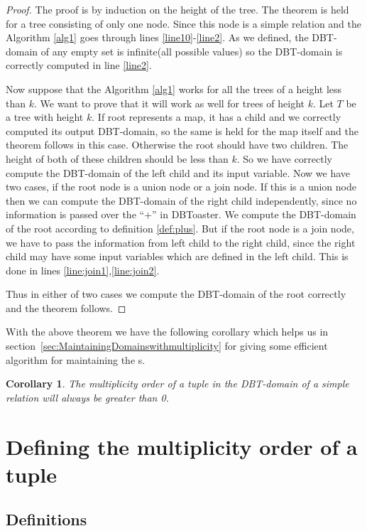 \documentclass[12pt]{article}
\newtheorem{corollary}{Corollary}[section]
\begin{document}
\begin{proof}
The proof is by induction on the height of the tree. The theorem is held for a tree consisting of only one node. Since this node is a simple relation and the Algorithm \ref{alg1} goes  through lines \ref{line10}-\ref{line2}. As we defined, the DBT-domain of any empty set is infinite(all possible values) so the DBT-domain is correctly computed in line \ref{line2}.

Now suppose that the Algorithm \ref{alg1} works for all the trees of a height less than $k$. We want to prove that it will work as well for trees of height $k$. Let $T$ be a tree with height $k$. If root represents a map, it has a child and we correctly computed its output DBT-domain, so the same is held for the map itself and the theorem follows in this case. Otherwise
the root should have two children. The height of both of these children should be less than $k$. So we have correctly compute the DBT-domain of the left child and its input variable. Now we have two cases, if the root node is a union node or a join node. If this is a union node then we can compute the DBT-domain of the right child independently, since no information is passed over the ``+'' in DBToaster\cite{1}. We compute the DBT-domain of the root according to definition \eqref{def:plus}. But if the root node is a join node, we have to pass the information from left child to the right child, since the right child may have some input variables which are defined in the left child. This is done in lines \ref{line:join1},\ref{line:join2}.\par
Thus in either of two cases we compute the DBT-domain of the root correctly and the theorem follows.
\end{proof}
With the above theorem we have the following corollary which helps us in section~\ref{sec:MaintainingDomainswithmultiplicity} for giving some efficient algorithm for maintaining the \dom{}s. 
\begin{corollary}
\label{col:arity0}
The multiplicity order of a tuple in the DBT-domain of a simple relation will always be greater than 0.
\end{corollary}
\section{Defining the multiplicity order of a tuple}

\subsection{Definitions}\label{Multip-def}
\end{document}
